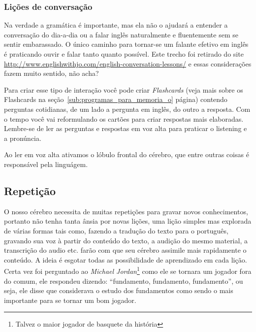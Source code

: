 \subsubsection{Lições de conversação}
\label{ssub:li_es_de_conversa_o}

Na verdade a gramática é importante, mas ela não o ajudará a entender
a conversação do dia-a-dia ou a falar inglês naturalmente e
fluentemente sem se sentir embarassado. O único caminho para tornar-se
um falante efetivo em inglês é praticando ouvir e falar tanto quanto
possível. Este trecho foi retirado do site
\href{http://www.englishwithjo.com/english-conversation-lessons/}{http://www.englishwithjo.com/english-conversation-lessons/}
e essas considerações fazem muito sentido, não acha?

Para criar esse tipo de interação você pode criar \emph{Flashcards}
(veja mais sobre os Flashcards na seção~\ref{sub:programas_para_memoria_o} página\pageref{sub:programas_para_memoria_o}) contendo perguntas
cotidianas, de um lado a pergunta em inglês, do outro a resposta. Com
o tempo você vai reformulando os cartões para criar respostas mais
elaboradas. Lembre-se de ler as perguntas e respostas em voz alta para
praticar o listening e a pronúncia.

{\footnotesize {} Ao ler em voz alta ativamos o lóbulo frontal
do cérebro, que entre outras coisas é responsável pela linguágem.}



\subsection{Repetição}

O nosso cérebro necessita de muitas repetições para gravar novos conhecimentos,
portanto não tenha tanta ânsia por novas lições, uma lição simples mas
explorada de várias formas tais como, fazendo a tradução do texto para
o português, gravando sua voz à partir do conteúdo do texto, a audição do mesmo
material, a transcrição do audio etc.  farão com que seu cérebro assimile mais
rapidamente o conteúdo. A ideia é esgotar todas as possibilidade de aprendizado
em cada lição. Certa vez foi perguntado ao  {\em Michael
Jordan}\footnote{Talvez o maior jogador de basquete da história} como ele se
tornara um jogador fora do comum, ele respondeu dizendo: ``fundamento,
fundamento, fundamento'', ou seja, ele disse que considerava o estudo dos
fundamentos como sendo o mais importante para se tornar um bom jogador.

